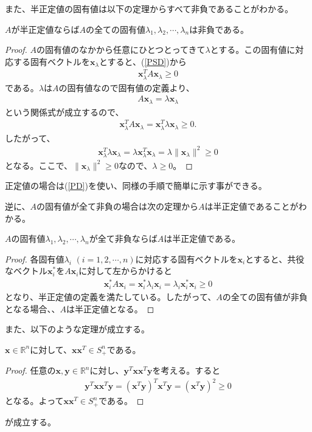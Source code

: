 また、半正定値の固有値は以下の定理からすべて非負であることがわかる。
\begin{theorem}
  $A$が半正定値ならば$A$の全ての固有値$\lambda_1, \lambda_2, \cdots, \lambda_n$は非負である。
\end{theorem}
\begin{proof}
  $A$の固有値のなかから任意にひとつとってきて$\lambda$とする。この固有値に対応する固有ベクトルを$\mathbf{x}_\lambda$とすると、(\ref{PSD})から
  \begin{align*}
    \mathbf{x}_\lambda^T A \mathbf{x}_\lambda \geq 0
  \end{align*}
  である。$\lambda$は$A$の固有値なので固有値の定義より、
  \begin{align*}
    A \mathbf{x}_\lambda = \lambda \mathbf{x}_\lambda
  \end{align*}
  という関係式が成立するので、
  \begin{align*}
    \mathbf{x}_\lambda^T A \mathbf{x}_\lambda = \mathbf{x}_\lambda^T \lambda \mathbf{x}_\lambda \geq 0.
  \end{align*}
  したがって、
  \begin{align*}
    \mathbf{x}_\lambda^T \lambda \mathbf{x}_\lambda = \lambda \mathbf{x}_\lambda^T \mathbf{x}_\lambda = \lambda \|\mathbf{x}_\lambda\|^2 \geq 0
  \end{align*}
  となる。ここで、$\|\mathbf{x}_\lambda\|^2 \geq 0$なので、$\lambda \geq 0$。
\end{proof}
正定値の場合は(\ref{PD})を使い、同様の手順で簡単に示す事ができる。

逆に、$A$の固有値が全て非負の場合は次の定理から$A$は半正定値であることがわかる。
\begin{theorem}
  $A$の固有値$\lambda_1, \lambda_2, \cdots, \lambda_n$が全て非負ならば$A$は半正定値である。
\end{theorem}
\begin{proof}
  各固有値$\lambda_i \,\, (i = 1, 2, \cdots, n)$に対応する固有ベクトルを$\mathbf{x}_i$とすると、共役なベクトル$\mathbf{x}_i^*$を$A \mathbf{x}_i$に対して左からかけると
  \begin{align*}
    \mathbf{x}_i^* A \mathbf{x}_i = \mathbf{x}_i^* \lambda_i \mathbf{x}_i = \lambda_i \mathbf{x}_i^* \mathbf{x}_i \geq 0
  \end{align*}
  となり、半正定値の定義を満たしている。したがって、$A$の全ての固有値が非負となる場合、、$A$は半正定値となる。
\end{proof}

また、以下のような定理が成立する。
\begin{theorem} \label{PsdMatrix}
  $\mathbf{x} \in \mathbb{R}^n$に対して、$\mathbf{x} \mathbf{x}^T \in S_+^n$である。
\end{theorem}
\begin{proof}
  任意の$\mathbf{x}, \mathbf{y} \in \mathbb{R}^n$に対し、$\mathbf{y}^T \mathbf{x} \mathbf{x}^T \mathbf{y}$を考える。すると
  \begin{align*}
    \mathbf{y}^T \mathbf{x} \mathbf{x}^T \mathbf{y} = \left(\mathbf{x}^T \mathbf{y}\right)^T \mathbf{x}^T \mathbf{y} = \left(\mathbf{x}^T \mathbf{y}\right)^2 \geq 0
  \end{align*}
  となる。よって$\mathbf{x} \mathbf{x}^T \in S_+^n$である。
\end{proof}
が成立する。
